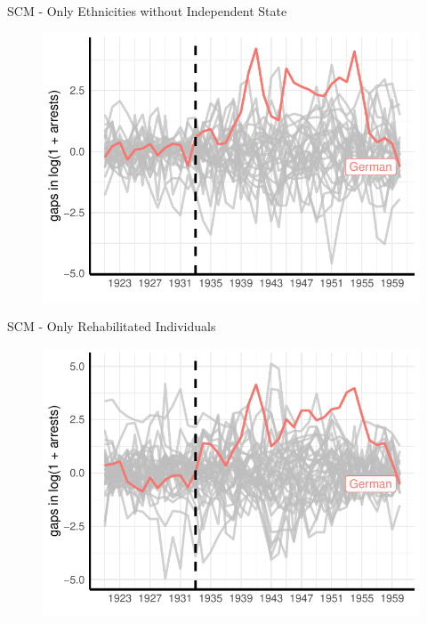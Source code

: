 \documentclass[11pt]{beamer}
\begin{document}
\begin{frame}[label=sc_without_ind_state]{SCM - Only Ethnicities without Independent State}
 \begin{figure}[h]
\centering
\includegraphics[width=1\textwidth]{placebo_highlight_all_ethnicities_without_ind_state.pdf}
\end{figure}
\hyperlink{sc_robustness_checks}{}
\end{frame}

\begin{frame}[label=sc_rehabs]{SCM - Only Rehabilitated Individuals}
 \begin{figure}[h]
\centering
\includegraphics[width=1\textwidth]{placebo_highlight_all_rehabs.pdf}
\end{figure}
\hyperlink{sc_robustness_checks}{}
\end{frame}
\end{document}
